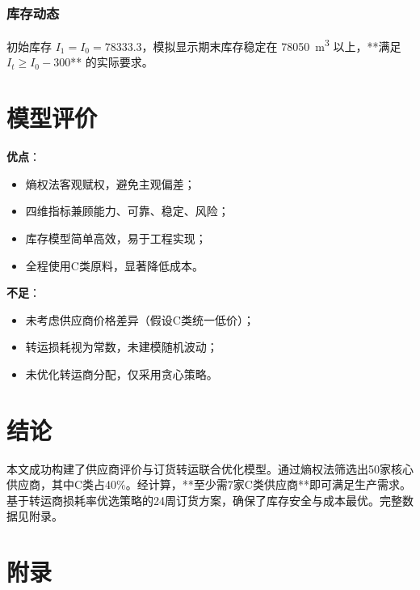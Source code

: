 \documentclass[12pt]{article}
\begin{document}
\subsubsection*{库存动态}

初始库存 $I_1 = I_0 = \num{78333.3}$，模拟显示期末库存稳定在 \SI{78050}{\cubic\meter} 以上，**满足 $I_t \geq I_0 - 300$** 的实际要求。

\section{模型评价}
\textbf{优点}：
\begin{itemize}
    \item 熵权法客观赋权，避免主观偏差；
    \item 四维指标兼顾能力、可靠、稳定、风险；
    \item 库存模型简单高效，易于工程实现；
    \item 全程使用C类原料，显著降低成本。
\end{itemize}

\textbf{不足}：
\begin{itemize}
    \item 未考虑供应商价格差异（假设C类统一低价）；
    \item 转运损耗视为常数，未建模随机波动；
    \item 未优化转运商分配，仅采用贪心策略。
\end{itemize}
\section{结论}
本文成功构建了供应商评价与订货转运联合优化模型。通过熵权法筛选出50家核心供应商，其中C类占40\%。经计算，**至少需7家C类供应商**即可满足生产需求。基于转运商损耗率优选策略的24周订货方案，确保了库存安全与成本最优。完整数据见附录。

\appendix
\section*{附录}
\end{document}
